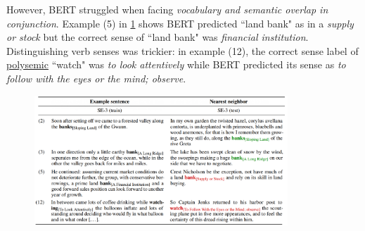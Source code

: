 However, BERT struggled when facing \emph{vocabulary and semantic overlap in conjunction}. Example (5) in \cref{tbl:bertPolysemy} shows BERT predicted ``land bank" as in a \emph{supply or stock} but the correct sense of ``land bank" was \emph{financial institution}. Distinguishing verb senses was trickier: in example (12), the correct sense label of \hyperref[sec:Polysemy]{polysemic} ``watch" was \emph{to look attentively} while BERT predicted its sense as \emph{to follow with the eyes or the mind; observe}. 



\begin{figure}[h]
\vspace{-5pt}
\centering
\includegraphics[width=0.85\textwidth]{imgs/table_bertPolysemyComparisons.png}
\vspace{-5pt}
\label{tbl:bertPolysemy}
\vspace{-5pt}
\end{figure}